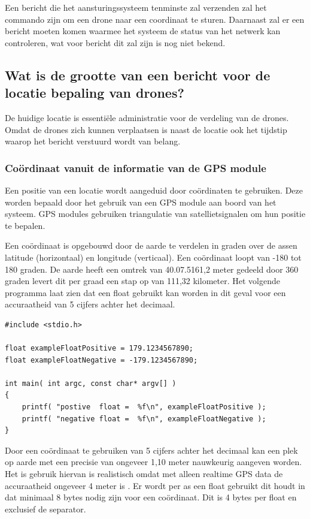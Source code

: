 \documentclass[a4paper, 11pt, oneside]{report}
\begin{document}
Een bericht die het aansturingssysteem tenminste zal verzenden zal het commando zijn om een drone naar een coordinaat te sturen.
Daarnaast zal er een bericht moeten komen waarmee het systeem de status van het netwerk kan controleren, wat voor bericht dit zal zijn is nog niet bekend.


\subsection{Wat is de grootte van een bericht voor de locatie bepaling van drones?}
\label{sub:locatie}
De huidige locatie is essentiële administratie voor de verdeling van de drones.
Omdat de drones zich kunnen verplaatsen is naast de locatie ook het tijdstip waarop het bericht verstuurd wordt van belang.

\subsubsection*{Coördinaat vanuit de informatie van de GPS module}
Een positie van een locatie wordt aangeduid door coördinaten te gebruiken.
Deze worden bepaald door het gebruik van een GPS module aan boord van het systeem.
GPS modules gebruiken triangulatie van satellietsignalen om hun positie te bepalen.  

Een coördinaat is opgebouwd door de aarde te verdelen in graden over de assen latitude (horizontaal) en longitude (verticaal).
Een coördinaat loopt van -180 tot 180 graden.
De aarde heeft een omtrek van 40.07.5161,2 meter gedeeld door 360 graden levert dit per graad een stap op van 111,32 kilometer. 
Het volgende programma laat zien dat een float gebruikt kan worden in dit geval voor een accuraatheid van 5 cijfers achter het decimaal.

\begin{lstlisting}
#include <stdio.h>

float exampleFloatPositive = 179.1234567890;
float exampleFloatNegative = -179.1234567890;

int main( int argc, const char* argv[] )
{
	printf( "postive  float =  %f\n", exampleFloatPositive );
	printf( "negative float =  %f\n", exampleFloatNegative );
}
\end{lstlisting}
 
Door een coördinaat te gebruiken van 5 cijfers achter het decimaal kan een plek op aarde met een precisie van ongeveer 1,10 meter nauwkeurig aangeven worden.
Het is gebruik hiervan is realistisch omdat met alleen realtime GPS data de accuraatheid ongeveer 4 meter is \cite{GPSaccu}.
Er wordt per as een float gebruikt dit houdt in dat minimaal 8 bytes nodig zijn voor een coördinaat.
Dit is 4 bytes per float en exclusief de separator. 
\end{document}
